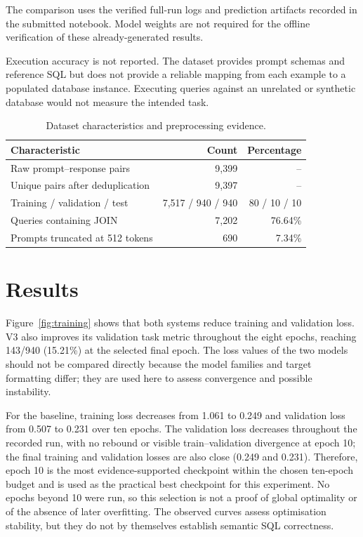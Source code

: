 \documentclass[10pt,a4paper]{article}
\begin{document}
The comparison uses the verified full-run logs and prediction artifacts recorded in the submitted notebook. Model weights are not required for the offline verification of these already-generated results.

Execution accuracy is not reported. The dataset provides prompt schemas and reference SQL but does not provide a reliable mapping from each example to a populated database instance. Executing queries against an unrelated or synthetic database would not measure the intended task.

\begin{table}[t]
\centering
\caption{Dataset characteristics and preprocessing evidence.}
\small
\begin{tabular}{lrr}
\toprule
Characteristic & Count & Percentage \\
\midrule
Raw prompt--response pairs & 9,399 & -- \\
Unique pairs after deduplication & 9,397 & -- \\
Training / validation / test & 7,517 / 940 / 940 & 80 / 10 / 10 \\
Queries containing JOIN & 7,202 & 76.64\% \\
Prompts truncated at 512 tokens & 690 & 7.34\% \\
\bottomrule
\end{tabular}
\end{table}

\section{Results}
Figure~\ref{fig:training} shows that both systems reduce training and validation loss. V3 also improves its validation task metric throughout the eight epochs, reaching 143/940 (15.21\%) at the selected final epoch. The loss values of the two models should not be compared directly because the model families and target formatting differ; they are used here to assess convergence and possible instability.

For the baseline, training loss decreases from 1.061 to 0.249 and validation loss from 0.507 to 0.231 over ten epochs. The validation loss decreases throughout the recorded run, with no rebound or visible train--validation divergence at epoch 10; the final training and validation losses are also close (0.249 and 0.231). Therefore, epoch 10 is the most evidence-supported checkpoint within the chosen ten-epoch budget and is used as the practical best checkpoint for this experiment. No epochs beyond 10 were run, so this selection is not a proof of global optimality or of the absence of later overfitting. The observed curves assess optimisation stability, but they do not by themselves establish semantic SQL correctness.
\end{document}

